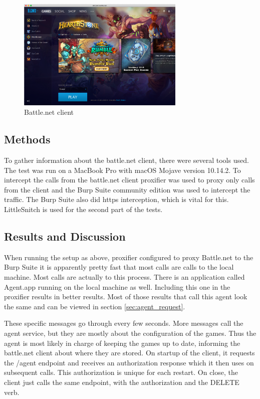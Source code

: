 \documentclass[12pt]{article}
\begin{document}
\begin{figure}[h]
  \includegraphics[width=8cm]{battlenetclient.png}
  \centering
  \caption{Battle.net client}
  \label{fig:client}
\end{figure}

\subsection{Methods}

To gather information about the battle.net client, there were several tools used. The test was run on a MacBook Pro with macOS Mojave version 10.14.2. To intercept the calls from the battle.net client proxifier was used to proxy only calls from the client and the Burp Suite community edition was used to intercept the traffic. The Burp Suite also did https interception, which is vital for this. LittleSnitch is used for the second part of the tests.

\subsection{Results and Discussion}

When running the setup as above, proxifier configured to proxy Battle.net to the Burp Suite it is apparently pretty fast that most calls are calls to the local machine. Most calls are actually to this process. There is an application called Agent.app running on the local machine as well. Including this one in the proxifier results in better results. Most of those results that call this agent look the same and can be viewed in section \ref{sec:agent_request}. 

These specific messages go through every few seconds. More messages call the agent service, but they are mostly about the configuration of the games. Thus the agent is most likely in charge of keeping the games up to date, informing the battle.net client about where they are stored. On startup of the client, it requests the /agent endpoint and receives an authorization response which it then uses on subsequent calls. This authorization is unique for each restart. On close, the client just calls the same endpoint, with the authorization and the DELETE verb. 
\end{document}

